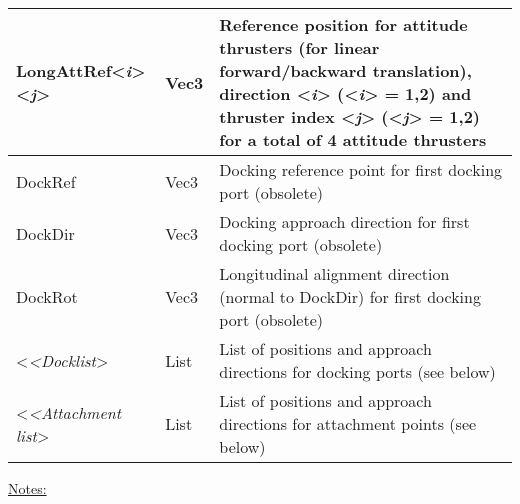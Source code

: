 \documentclass[Orbiter Developer Manual.tex]{subfiles}
\begin{document}
\begin{longtable}{ |p{}|p{}|p{}| }
	\hline\rule{0pt}{2ex}
	LongAttRef<\textit{i}><\textit{j}> & Vec3 & Reference position for attitude thrusters (for linear forward/backward translation), direction <\textit{i}> (<\textit{i}> = 1,2) and thruster index <\textit{j}> (<\textit{j}> = 1,2) for a total of 4 attitude thrusters\\
	\hline\rule{0pt}{2ex}
	DockRef & Vec3 & Docking reference point for first docking port (obsolete)\\
	\hline\rule{0pt}{2ex}
	DockDir & Vec3 & Docking approach direction for first docking port (obsolete)\\
	\hline\rule{0pt}{2ex}
	DockRot & Vec3 & Longitudinal alignment direction (normal to DockDir) for first docking port (obsolete)\\
	\hline\rule{0pt}{2ex}
	<\textit{<Docklist}> & List & List of positions and approach directions for docking ports (see below)\\
	\hline\rule{0pt}{2ex}
	<\textit{<Attachment list}> & List & List of positions and approach directions for attachment points (see below)\\
	\hline
	\end{longtable}

\noindent
\underline{Notes:}
\end{document}
